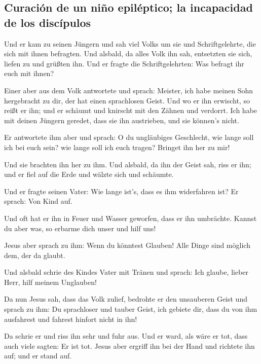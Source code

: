 \hypertarget{curaciuxf3n-de-un-niuxf1o-epiluxe9ptico-la-incapacidad-de-los-discuxedpulos}{%
\subsection{Curación de un niño epiléptico; la incapacidad de los
discípulos}\label{curaciuxf3n-de-un-niuxf1o-epiluxe9ptico-la-incapacidad-de-los-discuxedpulos}}

 Und er kam zu seinen Jüngern und sah viel Volks um sie
und Schriftgelehrte, die sich mit ihnen befragten.  Und
alsbald, da alles Volk ihn sah, entsetzten sie sich, liefen zu und
grüßten ihn.  Und er fragte die Schriftgelehrten: Was
befragt ihr euch mit ihnen?

 Einer aber aus dem Volk antwortete und sprach: Meister,
ich habe meinen Sohn hergebracht zu dir, der hat einen sprachlosen
Geist.  Und wo er ihn erwischt, so reißt er ihn; und er
schäumt und knirscht mit den Zähnen und verdorrt. Ich habe mit deinen
Jüngern geredet, dass sie ihn austrieben, und sie können's nicht.

 Er antwortete ihm aber und sprach: O du ungläubiges
Geschlecht, wie lange soll ich bei euch sein? wie lange soll ich euch
tragen? Bringet ihn her zu mir!

 Und sie brachten ihn her zu ihm. Und alsbald, da ihn der
Geist sah, riss er ihn; und er fiel auf die Erde und wälzte sich und
schäumte.

 Und er fragte seinen Vater: Wie lange ist's, dass es ihm
widerfahren ist? Er sprach: Von Kind auf.

 Und oft hat er ihn in Feuer und Wasser geworfen, dass er
ihn umbrächte. Kannst du aber was, so erbarme dich unser und hilf uns!

 Jesus aber sprach zu ihm: Wenn du könntest Glauben! Alle
Dinge sind möglich dem, der da glaubt.

 Und alsbald schrie des Kindes Vater mit Tränen und
sprach: Ich glaube, lieber Herr, hilf meinem Unglauben!

 Da nun Jesus sah, dass das Volk zulief, bedrohte er den
unsauberen Geist und sprach zu ihm: Du sprachloser und tauber Geist, ich
gebiete dir, dass du von ihm ausfahrest und fahrest hinfort nicht in
ihn!

 Da schrie er und riss ihn sehr und fuhr aus. Und er
ward, als wäre er tot, dass auch viele sagten: Er ist tot.
 Jesus aber ergriff ihn bei der Hand und richtete ihn
auf; und er stand auf.

